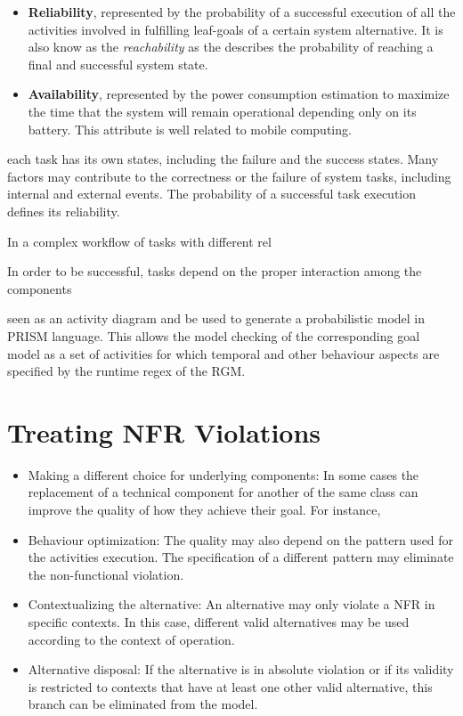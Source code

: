\begin{itemize}

\item \textbf{Reliability}, represented by the probability of a successful execution of all the activities involved in fulfilling leaf-goals of a certain system alternative. It is also know as the \textit{reachability} as the describes the probability of reaching a final and successful system state. 
\bigskip

\item \textbf{Availability}, represented by the power consumption estimation to maximize the time that the system will remain operational depending only on its battery. This attribute is well related to mobile computing. 
\medskip

\end{itemize}


each task has its own states, including the failure and the success states. Many factors may contribute to the correctness or the failure of system tasks, including internal and external events. The probability of a successful task execution defines its reliability. 

In a complex workflow of tasks with different rel 

In order to be successful, tasks depend on the proper interaction among the components 

seen as an activity diagram and be used to generate a probabilistic model in PRISM language. This allows the model checking of the corresponding goal model as a set of activities for which temporal and other behaviour aspects are specified by the runtime regex of the RGM.

\section{Treating NFR Violations}

\begin{itemize}

\item Making a different choice for underlying components: In some cases the replacement of a technical component for another of the same class can improve the quality of how they achieve their goal. For instance,
\medskip

\item Behaviour optimization: The quality may also depend on the pattern used for the activities execution. The specification of a different pattern may eliminate the non-functional violation. 
\medskip

\item Contextualizing the alternative: An alternative may only violate a NFR in specific contexts. In this case, different valid alternatives may be used according to the context of operation.
\medskip

\item Alternative disposal: If the alternative is in absolute violation or if its validity is restricted to contexts that have at least one other valid alternative, this branch can be eliminated from the model.

\end{itemize}

